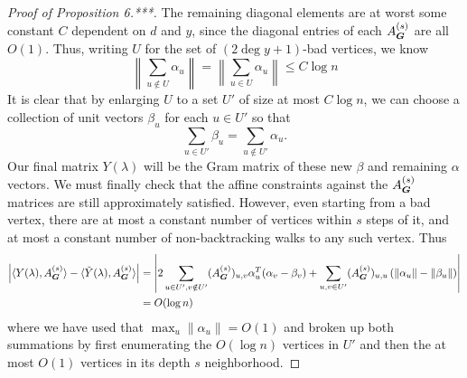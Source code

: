 \begin{proof}[Proof of Proposition 6.***]
    The remaining diagonal elements are at worst some constant $C$ dependent on $d$ and $y$, since the diagonal entries of each $A^{(s)}_{\boldsymbol{G}}$ are all $O(1)$. Thus, writing $U$ for the set of $(2\deg y + 1)$-bad vertices, we know
    $$
        \left\|\sum_{u \notin U} \alpha_u \right\| = \left\|\sum_{u\in U} \alpha_u \right\| \le C\log n
    $$
    It is clear that by enlarging $U$ to a set $U'$ of size at most $C\log n$, we can choose a collection of unit vectors $\beta_u$ for each $u \in U'$ so that $$
        \sum_{u \in U'} \beta_u = \sum_{u\notin U'} \alpha_u. 
    $$
    Our final matrix $Y(\lambda)$ will be the Gram matrix of these new $\beta$ and remaining $\alpha$ vectors. We must finally check that the affine constraints against the $A^{(s)}_{\boldsymbol{G}}$ matrices are still approximately satisfied. However, even starting from a bad vertex, there are at most a constant number of vertices within $s$ steps of it, and at most a constant number of non-backtracking walks to any such vertex. Thus
    \begin{align*}
        \left|\langle Y(\lambda),A^{(s)}_{\boldsymbol{G}} \rangle - \langle \tilde Y(\lambda),A^{(s)}_{\boldsymbol{G}} \rangle \right| &= \left| 2\sum_{u\in U',v\notin U'} (A^{(s)}_{\boldsymbol{G}})_{u,v}\alpha_u^T(\alpha_v - \beta_v) + \sum_{u,v\in U'} (A^{(s)}_{\boldsymbol{G}})_{u,u}\left(\|\alpha_u\| - \|\beta_u\|\right)\right| \\
        &= O(\log n)
    \end{align*}
    where we have used that $\max_u \|\alpha_u\| = O(1)$ and broken up both summations by first enumerating the $O(\log n)$ vertices in $U'$ and then the at most $O(1)$ vertices in its depth $s$ neighborhood.
\end{proof}


